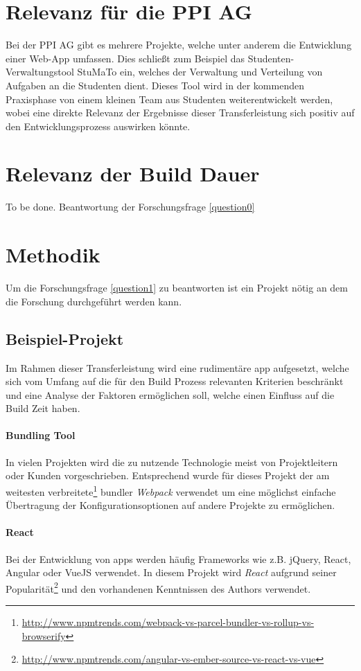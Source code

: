 \documentclass[11pt]{report}
\begin{document}
		\section{Relevanz für die PPI AG}
			Bei der PPI AG gibt es mehrere Projekte, welche unter anderem die Entwicklung einer Web-App umfassen. Dies schließt zum Beispiel das Studenten-Verwaltungstool StuMaTo ein, welches der Verwaltung und Verteilung von Aufgaben an die Studenten dient. Dieses Tool wird in der kommenden Praxisphase von einem kleinen Team aus Studenten weiterentwickelt werden, wobei eine direkte Relevanz der Ergebnisse dieser Transferleistung sich positiv auf den Entwicklungsprozess auswirken könnte.
	
		\section{Relevanz der Build Dauer}
		 	To be done. Beantwortung der Forschungsfrage \ref{question0} %

		\section{Methodik}
			Um die Forschungsfrage \ref{question1} zu beantworten ist ein Projekt nötig an dem die Forschung durchgeführt werden kann.
			\subsection{Beispiel-Projekt}
				Im Rahmen dieser Transferleistung wird eine rudimentäre \Gls{app} aufgesetzt, welche sich vom Umfang auf die für den Build Prozess relevanten Kriterien beschränkt und eine Analyse der Faktoren ermöglichen soll, welche einen Einfluss auf die Build Zeit haben.

				\paragraph{Bundling Tool} In vielen Projekten wird die zu nutzende Technologie meist von Projektleitern oder Kunden vorgeschrieben. Entsprechend wurde für dieses Projekt der am weitesten verbreitete\footnote{\url{http://www.npmtrends.com/webpack-vs-parcel-bundler-vs-rollup-vs-browserify}} \Gls{bundler} \emph{Webpack} verwendet um eine möglichst einfache Übertragung der Konfigurationsoptionen auf andere Projekte zu ermöglichen.

				\paragraph{React} Bei der Entwicklung von \Glspl{app} werden häufig Frameworks wie z.B. jQuery, React, Angular oder VueJS verwendet. In diesem Projekt wird \emph{React} aufgrund seiner Popularität\footnote{\url{http://www.npmtrends.com/angular-vs-ember-source-vs-react-vs-vue}} und den vorhandenen Kenntnissen des Authors verwendet.
\end{document}
